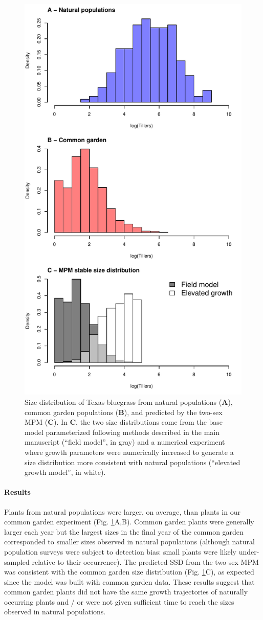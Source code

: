 \documentclass[11pt]{article}
\begin{document}
\newpage
\begin{figure}[H]
	\begin{center}
		\includegraphics[width=0.5\linewidth]{Figures/size_dist}
		\caption{Size distribution of Texas bluegrass from natural populations (\textbf{A}), common garden populations (\textbf{B}), and predicted by the two-sex MPM (\textbf{C}). 
			In \textbf{C}, the two size distributions come from the base model parameterized following methods described in the main manuscript (``field model'', in gray) and a numerical experiment where growth parameters were numerically increased to generate a size distribution more consistent with natural populations (``elevated growth model'', in white). 
		}
		\label{fig:size_dist}
	\end{center}
\end{figure}

\paragraph{Results}
Plants from natural populations were larger, on average, than plants in our common garden experiment (Fig. \ref{fig:size_dist}A,B).
Common garden plants were generally larger each year but the largest sizes in the final year of the common garden corresponded to smaller sizes observed in natural populations (although natural population surveys were subject to detection bias: small plants were likely under-sampled relative to their occurrence). 
The predicted SSD from the two-sex MPM was consistent with the common garden size distribution (Fig. \ref{fig:size_dist}C), as expected since the model was built with common garden data. 
These results suggest that common garden plants did not have the same growth trajectories of naturally occurring plants and / or were not given sufficient time to reach the sizes observed in natural populations. 
\end{document}
